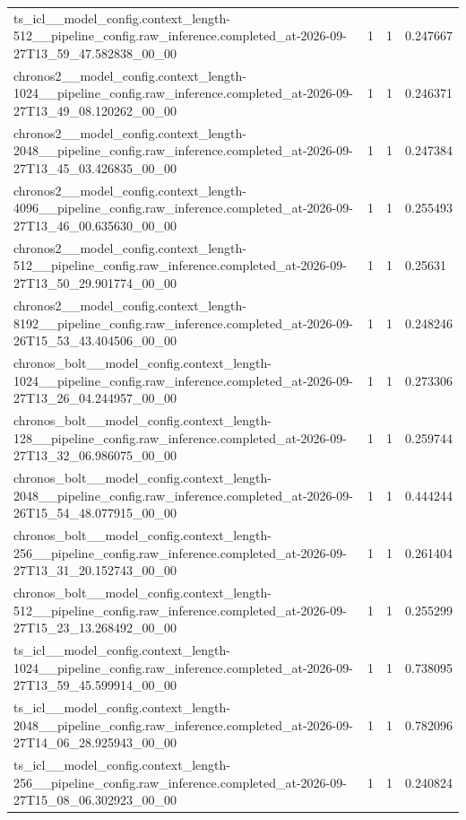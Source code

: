 \begin{tabular}{llll}
ts\_icl\_\_model\_config.context\_length-512\_\_pipeline\_config.raw\_inference.completed\_at-2026-09-27T13\_59\_47.582838\_00\_00 & 1 & 1 & 0.247667 \\
chronos2\_\_model\_config.context\_length-1024\_\_pipeline\_config.raw\_inference.completed\_at-2026-09-27T13\_49\_08.120262\_00\_00 & 1 & 1 & 0.246371 \\
chronos2\_\_model\_config.context\_length-2048\_\_pipeline\_config.raw\_inference.completed\_at-2026-09-27T13\_45\_03.426835\_00\_00 & 1 & 1 & 0.247384 \\
chronos2\_\_model\_config.context\_length-4096\_\_pipeline\_config.raw\_inference.completed\_at-2026-09-27T13\_46\_00.635630\_00\_00 & 1 & 1 & 0.255493 \\
chronos2\_\_model\_config.context\_length-512\_\_pipeline\_config.raw\_inference.completed\_at-2026-09-27T13\_50\_29.901774\_00\_00 & 1 & 1 & 0.25631 \\
chronos2\_\_model\_config.context\_length-8192\_\_pipeline\_config.raw\_inference.completed\_at-2026-09-26T15\_53\_43.404506\_00\_00 & 1 & 1 & 0.248246 \\
chronos\_bolt\_\_model\_config.context\_length-1024\_\_pipeline\_config.raw\_inference.completed\_at-2026-09-27T13\_26\_04.244957\_00\_00 & 1 & 1 & 0.273306 \\
chronos\_bolt\_\_model\_config.context\_length-128\_\_pipeline\_config.raw\_inference.completed\_at-2026-09-27T13\_32\_06.986075\_00\_00 & 1 & 1 & 0.259744 \\
chronos\_bolt\_\_model\_config.context\_length-2048\_\_pipeline\_config.raw\_inference.completed\_at-2026-09-26T15\_54\_48.077915\_00\_00 & 1 & 1 & 0.444244 \\
chronos\_bolt\_\_model\_config.context\_length-256\_\_pipeline\_config.raw\_inference.completed\_at-2026-09-27T13\_31\_20.152743\_00\_00 & 1 & 1 & 0.261404 \\
chronos\_bolt\_\_model\_config.context\_length-512\_\_pipeline\_config.raw\_inference.completed\_at-2026-09-27T15\_23\_13.268492\_00\_00 & 1 & 1 & 0.255299 \\
ts\_icl\_\_model\_config.context\_length-1024\_\_pipeline\_config.raw\_inference.completed\_at-2026-09-27T13\_59\_45.599914\_00\_00 & 1 & 1 & 0.738095 \\
ts\_icl\_\_model\_config.context\_length-2048\_\_pipeline\_config.raw\_inference.completed\_at-2026-09-27T14\_06\_28.925943\_00\_00 & 1 & 1 & 0.782096 \\
ts\_icl\_\_model\_config.context\_length-256\_\_pipeline\_config.raw\_inference.completed\_at-2026-09-27T15\_08\_06.302923\_00\_00 & 1 & 1 & 0.240824 \\

\end{tabular}

